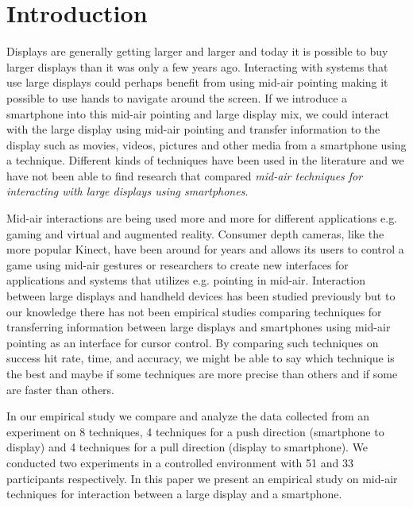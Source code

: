 \section{Introduction} \label{sec:introduction}
Displays are generally getting larger and larger and today it is possible to buy larger displays than it was only a few years ago.
Interacting with systems that use large displays could perhaps benefit from using mid-air pointing making it possible to use hands to navigate around the screen.
If we introduce a smartphone into this mid-air pointing and large display mix, we could interact with the large display using mid-air pointing and transfer information to the display such as movies, videos, pictures and other media from a smartphone using a technique.
Different kinds of techniques have been used in the literature and we have not been able to find research that compared \emph{mid-air techniques for interacting with large displays using smartphones}.

Mid-air interactions are being used more and more for different applications e.g. gaming and virtual and augmented reality.
Consumer depth cameras, like the more popular Kinect, have been around for years and allows its users to control a game using mid-air gestures or researchers to create new interfaces for applications and systems that utilizes e.g. pointing in mid-air.
Interaction between large displays and handheld devices has been studied previously but to our knowledge there has not been empirical studies comparing techniques for transferring information between large displays and smartphones using mid-air pointing as an interface for cursor control.
By comparing such techniques on success hit rate, time, and accuracy, we might be able to say which technique is the best and maybe if some techniques are more precise than others and if some are faster than others.

In our empirical study we compare and analyze the data collected from an experiment on 8 techniques, 4 techniques for a push direction (smartphone to display) and 4 techniques for a pull direction (display to smartphone).
We conducted two experiments in a controlled environment with 51 and 33 participants respectively.
In this paper we present an empirical study on mid-air techniques for interaction between a large display and a smartphone.